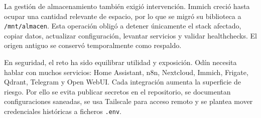 La gestión de almacenamiento también exigió intervención. Immich creció hasta ocupar una cantidad relevante de espacio, por lo que se migró su biblioteca a \nolinkurl{/mnt/almacen}. Esta operación obligó a detener únicamente el stack afectado, copiar datos, actualizar configuración, levantar servicios y validar healthchecks. El origen antiguo se conservó temporalmente como respaldo.

En seguridad, el reto ha sido equilibrar utilidad y exposición. Odín necesita hablar con muchos servicios: Home Assistant, n8n, Nextcloud, Immich, Frigate, Qdrant, Telegram y Open WebUI. Cada integración aumenta la superficie de riesgo. Por ello se evita publicar secretos en el repositorio, se documentan configuraciones saneadas, se usa Tailscale para acceso remoto y se plantea mover credenciales históricas a ficheros \texttt{.env}.
